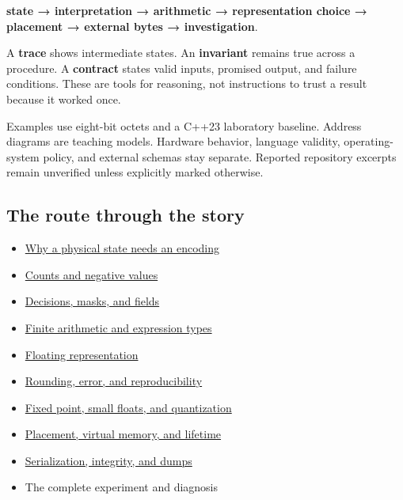 \textbf{state → interpretation → arithmetic → representation choice → placement → external bytes → investigation}.

A \textbf{trace} shows intermediate states. An \textbf{invariant} remains true across a procedure. A \textbf{contract} states valid inputs, promised output, and failure conditions. These are tools for reasoning, not instructions to trust a result because it worked once.

Examples use eight-bit octets and a C++23 laboratory baseline. Address diagrams are teaching models. Hardware behavior, language validity, operating-system policy, and external schemas stay separate. Reported repository excerpts remain unverified unless explicitly marked otherwise.

\subsection{The route through the story}\label{05-engine-i-ch001-the-route-through-the-story}

\hypertarget{05-engine-i-ch001-the-route-through-the-story}{}

\begin{itemize}
\tightlist
\item
  \hyperref[05-engine-i-ch001-prologue---how-a-physical-state-became-a-byte]{Why a physical state needs an encoding}
\item
  \hyperref[05-engine-i-ch001-from-a-signal-to-an-interpretation]{Counts and negative values}
\item
  \hyperref[05-engine-i-ch001-bits-become-decisions-and-compact-fields]{Decisions, masks, and fields}
\item
  \hyperref[05-engine-i-ch001-arithmetic-becomes-a-policy]{Finite arithmetic and expression types}
\item
  \hyperref[05-engine-i-ch001-a-stretching-ruler-for-real-valued-quantities]{Floating representation}
\item
  \hyperref[05-engine-i-ch001-when-arithmetic-meets-uncertainty]{Rounding, error, and reproducibility}
\item
  \hyperref[05-engine-i-ch001-choosing-what-information-to-keep]{Fixed point, small floats, and quantization}
\item
  \hyperref[05-engine-i-ch002-where-the-bytes-live]{Placement, virtual memory, and lifetime}
\item
  \hyperref[05-engine-i-ch002-bytes-become-a-durable-agreement]{Serialization, integrity, and dumps}
\item
  {The complete experiment and diagnosis}
\end{itemize}

